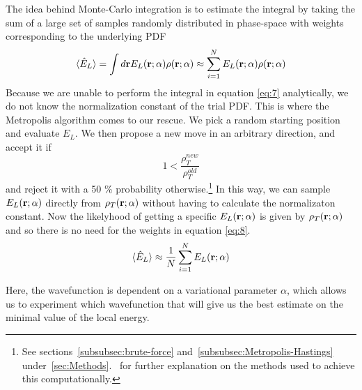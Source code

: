 \documentclass[
    a4paper, aps, twocolumn, floatfix, superscriptaddress,
    nofootinbib]{revtex4-1}
\begin{document}
The idea behind Monte-Carlo integration is to estimate the integral by taking the sum of a large set of samples randomly distributed in phase-space with weights corresponding to the underlying PDF
\begin{equation}\label{eq:8}
    \langle \hat{E}_L \rangle = \int d\bold r E_L(\bold r; \alpha) \rho(\bold r; \alpha) \approx  \sum_{i=1}^{N} E_L(\bold r; \alpha) \rho(\bold r; \alpha)
\end{equation}
Because we are unable to perform the integral in equation \eqref{eq:7} analytically, we do not know the normalization constant of the trial PDF. This is where the Metropolis algorithm comes to our rescue. We pick a random starting position and evaluate $E_L$. We then propose a new move in an arbitrary direction, and accept it if 
\begin{equation}
    1<\frac{\rho_T^{new}}{\rho_T^{old}}
\end{equation}
and reject it with a 50 \% probability otherwise.\footnote{See sections~\ref{subsubsec:brute-force} and~\ref{subsubsec:Metropolis-Hastings} under~\ref{sec:Methods}.~ for further explanation on the methods used to achieve this computationally.} In this way, we can sample $E_L(\bold r; \alpha)$ directly from $\rho_T(\bold r; \alpha)$ without having to calculate the normalizaton constant. Now the likelyhood of getting a specific $E_L(\bold r; \alpha)$ is given by $\rho_T(\bold r; \alpha)$ and so there is no need for the weights in equation \eqref{eq:8}.
\begin{equation}
    \langle \hat{E}_L \rangle \approx \frac{1}{N} \sum_{i=1}^{N} E_L(\bold r; \alpha)
\end{equation}



\vspace{10}
Here, the wavefunction is dependent on a variational parameter $\alpha$, which allows us to experiment which wavefunction that will give us the best estimate on the minimal value of the local energy.
\end{document}

